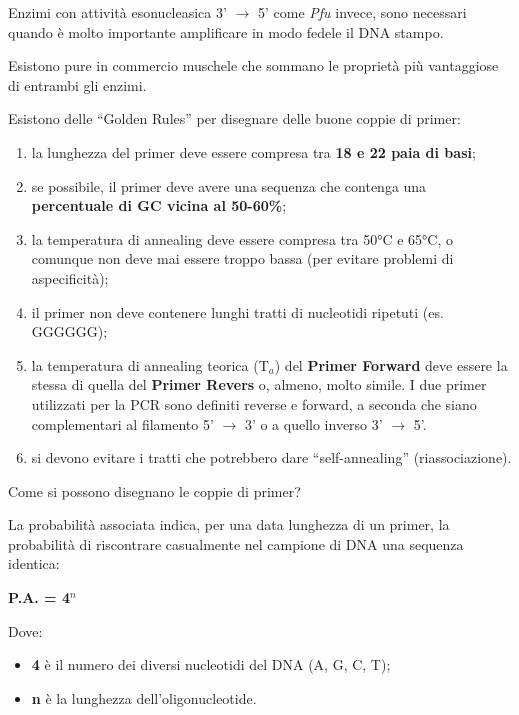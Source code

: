 \documentclass[]{article}
\begin{document}
Enzimi con attività esonucleasica 3' \(\rightarrow\) 5' come \emph{Pfu}
invece, sono necessari quando è molto importante amplificare in modo
fedele il DNA stampo.

Esistono pure in commercio muschele che sommano le proprietà più
vantaggiose di entrambi gli enzimi.

Esistono delle ``Golden Rules'' per disegnare delle buone coppie di
primer:

\begin{enumerate}
\def\labelenumi{\arabic{enumi}.}
\itemsep1pt\parskip0pt
\item
  la lunghezza del primer deve essere compresa tra \textbf{18 e 22 paia
  di basi};
\item
  se possibile, il primer deve avere una sequenza che contenga una
  \textbf{percentuale di GC vicina al 50-60\%};
\item
  la temperatura di annealing deve essere compresa tra 50°C e 65°C, o
  comunque non deve mai essere troppo bassa (per evitare problemi di
  aspecificità);
\item
  il primer non deve contenere lunghi tratti di nucleotidi ripetuti (es.
  GGGGGG);
\item
  la temperatura di annealing teorica (T\(_a\)) del \textbf{Primer
  Forward} deve essere la stessa di quella del \textbf{Primer Revers} o,
  almeno, molto simile. I due primer utilizzati per la PCR sono definiti
  reverse e forward, a seconda che siano complementari al filamento 5'
  \(\rightarrow\) 3' o a quello inverso 3' \(\rightarrow\) 5'.
\item
  si devono evitare i tratti che potrebbero dare ``self-annealing''
  (riassociazione).
\end{enumerate}

Come si possono disegnano le coppie di primer?

La probabilità associata indica, per una data lunghezza di un primer, la
probabilità di riscontrare casualmente nel campione di DNA una sequenza
identica:

\textbf{P.A. = 4\(^n\)}

Dove:

\begin{itemize}
\itemsep1pt\parskip0pt
\item
  \textbf{4} è il numero dei diversi nucleotidi del DNA (A, G, C, T);
\item
  \textbf{n} è la lunghezza dell'oligonucleotide.
\end{itemize}
\end{document}
